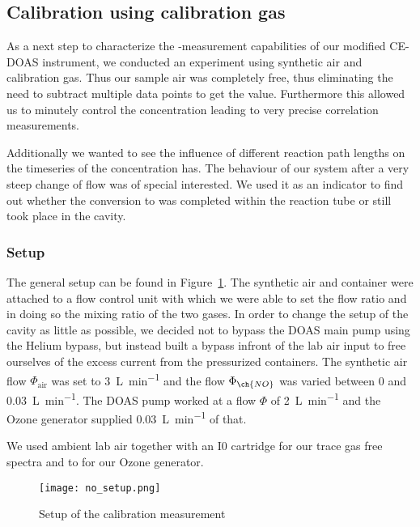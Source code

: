 \subsection{Calibration using calibration gas}
\label{sec:no}

As a next step to characterize the -measurement capabilities of
our modified CE-DOAS instrument, we conducted an experiment using
synthetic air and  calibration gas. Thus our sample air
was completely  free, thus eliminating the need to subtract
multiple data points to get the  value. Furthermore this
allowed us to minutely control the  concentration leading to
very precise correlation measurements.

Additionally we wanted to see the influence of different reaction path
lengths on the timeseries of the  concentration has. The
behaviour of our system  after a very steep change of flow was of
special interested. We used it as an indicator to find out whether the
 conversion to  was completed within the reaction tube
or still took place in the cavity.

\subsubsection{Setup}
\label{sec:no-setup}

The general setup can be found in Figure~\ref{fig:no-setup}. The
synthetic air and  container were attached to a flow control
unit with which we were able to set the flow ratio and in doing so the
mixing ratio of the two gases. In order to change the setup of the
cavity as little as possible, we decided not to bypass the DOAS main
pump using the Helium bypass, but instead built a bypass infront of
the lab air input to free ourselves of the excess current from the
pressurized containers. The synthetic air flow $\Phi_\text{air}$ was
set to \SI{3}{\liter\per\minute} and the  flow $\Phi_{\ch{NO}}$
was varied between \num{0} and \SI{0.03}{\liter\per\minute}. The DOAS
pump worked at a flow $\Phi$ of \SI{2}{\liter\per\minute} and the
Ozone generator supplied \SI{0.03}{\liter\per\minute} of that.

We used ambient lab air together with an I0 cartridge for our trace
gas free spectra and to for our Ozone generator.

\begin{figure}[htbp]
  \centering
  \texttt{[image: no\_setup.png]}
  \caption{Setup of the calibration measurement}
  \label{fig:no-setup}
\end{figure}

